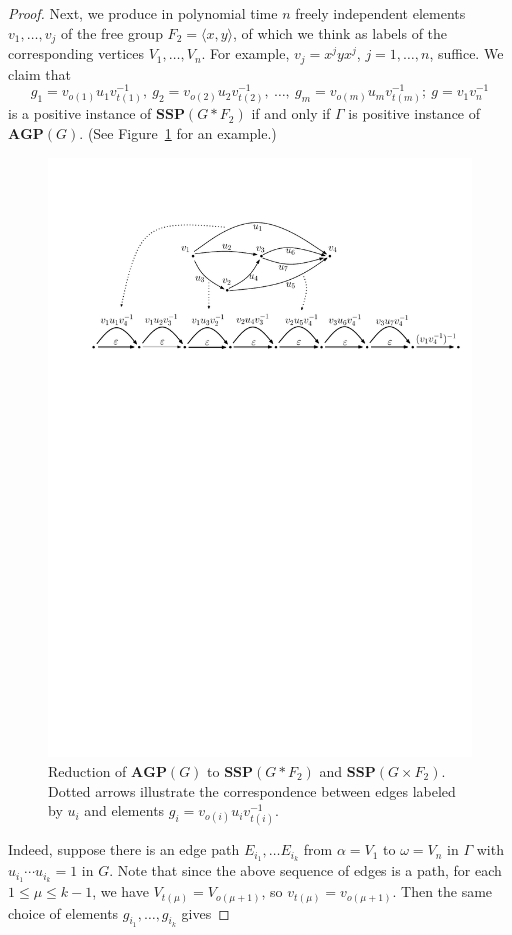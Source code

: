 \documentclass[10pt]{amsart}
\theoremstyle{definition}
\def\SSP{{\mathbf{SSP}}}
\def\AGP{{\mathbf{AGP}}}
\begin{document}
\begin{proof}
Next, we produce in polynomial time $n$ freely independent elements $v_1,\ldots, v_j$ of the free group $F_2= \langle x, y \rangle$, of which we think as labels of the corresponding vertices $V_1,\ldots, V_n$. For example, $v_j=x^jyx^j$, $j=1,\ldots,n$, suffice.
We claim that
$$g_1 = v_{o(1)}u_1v_{t(1)}^{-1},\ g_2=v_{o(2)}u_2v_{t(2)}^{-1},\ \ldots,\ g_m=v_{o(m)}u_mv_{t(m)}^{-1};\ g=v_{1}v_{n}^{-1}
$$
is a positive instance of $\SSP(G\ast F_2)$ if and only if $\Gamma$ is positive instance of $\AGP(G)$. (See Figure~\ref{fi:agp_to_ssp} for an example.)
\begin{figure}[h]
 \centering
 \includegraphics[width=4.5in]{agp_to_ssp}
 \caption{Reduction of $\AGP(G)$ to $\SSP(G\ast F_2)$ and $\SSP(G\times F_2)$. Dotted arrows illustrate the correspondence between edges labeled by $u_i$ and elements $g_i=v_{o(i)}u_iv_{t(i)}^{-1}$.}\label{fi:agp_to_ssp}
\end{figure}
Indeed, suppose there is an edge path $E_{i_1}, \ldots E_{i_k}$ from $\alpha=V_1$ to $\omega=V_n$ in $\Gamma$ with $u_{i_1}\cdots u_{i_k}=1$ in $G$. Note that since the above sequence of edges is a path, for each $1\le \mu\le k-1$, we have $V_{t(\mu)}=V_{o(\mu+1)}$, so $v_{t(\mu)}=v_{o(\mu+1)}$. Then the same choice of elements $g_{i_1},\ldots, g_{i_k}$ gives

\end{proof}
\end{document}
